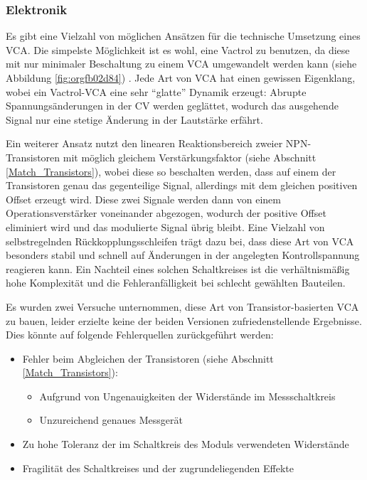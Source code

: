 \subsubsection{Elektronik}
\label{sec:orge630239}
Es gibt eine Vielzahl von möglichen Ansätzen für die technische Umsetzung eines \ac{VCA}. Die simpelste Möglichkeit ist es wohl, eine Vactrol zu benutzen, da diese mit nur minimaler Beschaltung zu einem \ac{VCA} umgewandelt werden kann (siehe Abbildung \ref{fig:orgfb02d84}) \cite{miaw:vca}. Jede Art von \ac{VCA} hat einen gewissen Eigenklang, wobei ein Vactrol-VCA eine sehr "`glatte"' Dynamik erzeugt: Abrupte Spannungsänderungen in der \acl{CV} werden geglättet, wodurch das ausgehende Signal nur eine stetige Änderung in der Lautstärke erfährt.

Ein weiterer Ansatz nutzt den linearen Reaktionsbereich zweier NPN-Transistoren mit möglich gleichem Verstärkungsfaktor (siehe Abschnitt \ref{Match_Transistors}), wobei diese so beschalten werden, dass auf einem der Transistoren genau das gegenteilige Signal, allerdings mit dem gleichen positiven Offset erzeugt wird. Diese zwei Signale werden dann von einem Operationsverstärker voneinander abgezogen, wodurch der positive Offset eliminiert wird und das modulierte Signal übrig bleibt. Eine Vielzahl von selbstregelnden Rückkopplungsschleifen trägt dazu bei, dass diese Art von \ac{VCA} besonders stabil und schnell auf Änderungen in der angelegten Kontrollspannung reagieren kann. Ein Nachteil eines solchen Schaltkreises ist die verhältnismäßig hohe Komplexität und die Fehleranfälligkeit bei schlecht gewählten Bauteilen.

Es wurden zwei Versuche unternommen, diese Art von Transistor-basierten VCA \cite{klein:vca} zu bauen, leider erzielte keine der beiden Versionen zufriedenstellende Ergebnisse. Dies könnte auf folgende Fehlerquellen zurückgeführt werden:
\begin{itemize}
\item Fehler beim Abgleichen der Transistoren (siehe Abschnitt \ref{Match_Transistors}):
\begin{itemize}
\item Aufgrund von Ungenauigkeiten der Widerstände im Messschaltkreis
\item Unzureichend genaues Messgerät
\end{itemize}
\item Zu hohe Toleranz der im Schaltkreis des Moduls verwendeten Widerstände
\item Fragilität des Schaltkreises und der zugrundeliegenden Effekte
\end{itemize}

